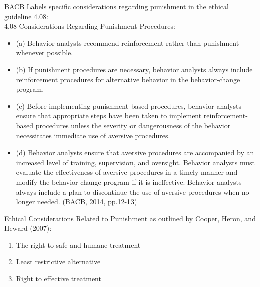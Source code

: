 \noindent BACB Labels specific considerations regarding punishment in the ethical guideline 4.08:\\
4.08 Considerations Regarding Punishment Procedures:
\begin{itemize}
\item (a) Behavior analysts recommend reinforcement rather than punishment whenever possible. 
\item (b) If punishment procedures are necessary, behavior analysts always include reinforcement procedures for alternative behavior in the behavior-change program. 
\item (c) Before implementing punishment-based procedures, behavior analysts ensure that appropriate steps  
have been taken to implement reinforcement-based procedures unless the severity or dangerousness of the behavior necessitates immediate use of aversive procedures.
\item (d) Behavior analysts ensure that aversive procedures are accompanied by an increased level of training, supervision, and oversight. Behavior analysts must evaluate the effectiveness of aversive procedures in a timely manner and modify the behavior-change program if it is ineffective. Behavior analysts always include a plan to discontinue the use of aversive procedures when no longer needed. (BACB, 2014, pp.12-13)
\end{itemize}
%
Ethical Considerations Related to Punishment as outlined by Cooper, Heron, and Heward (2007):
\begin{enumerate}
\item The right to safe and humane treatment
\item Least restrictive alternative
\item Right to effective treatment
\end{enumerate}

